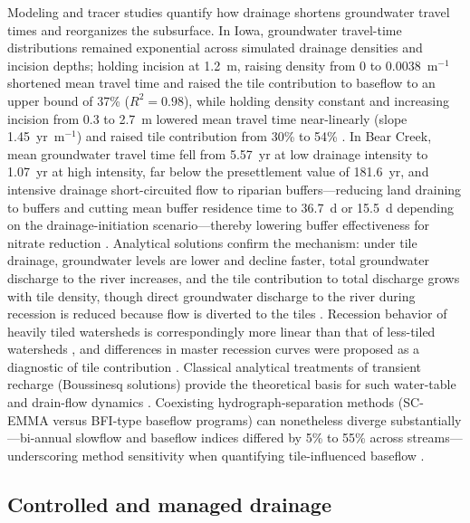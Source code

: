 Modeling and tracer studies quantify how drainage shortens groundwater travel times and reorganizes the subsurface. In Iowa, groundwater travel-time distributions remained exponential across simulated drainage densities and incision depths; holding incision at 1.2~m, raising density from 0 to 0.0038~m$^{-1}$ shortened mean travel time and raised the tile contribution to baseflow to an upper bound of 37\% ($R^2=0.98$), while holding density constant and increasing incision from 0.3 to 2.7~m lowered mean travel time near-linearly (slope 1.45~yr~m$^{-1}$) and raised tile contribution from 30\% to 54\% \parencite{Schilling2012}. In Bear Creek, mean groundwater travel time fell from 5.57~yr at low drainage intensity to 1.07~yr at high intensity, far below the presettlement value of 181.6~yr, and intensive drainage short-circuited flow to riparian buffers---reducing land draining to buffers and cutting mean buffer residence time to 36.7~d or 15.5~d depending on the drainage-initiation scenario---thereby lowering buffer effectiveness for nitrate reduction \parencite{Schilling2015}. Analytical solutions confirm the mechanism: under tile drainage, groundwater levels are lower and decline faster, total groundwater discharge to the river increases, and the tile contribution to total discharge grows with tile density, though direct groundwater discharge to the river during recession is reduced because flow is diverted to the tiles \parencite{Liang2015}. Recession behavior of heavily tiled watersheds is correspondingly more linear than that of less-tiled watersheds \parencite{Schilling2008}, and differences in master recession curves were proposed as a diagnostic of tile contribution \parencite{Schilling2008}. Classical analytical treatments of transient recharge (Boussinesq solutions) provide the theoretical basis for such water-table and drain-flow dynamics \parencite{SINGH1980,Bouarfa2000}. Coexisting hydrograph-separation methods (SC-EMMA versus BFI-type baseflow programs) can nonetheless diverge substantially---bi-annual slowflow and baseflow indices differed by 5\% to 55\% across streams---underscoring method sensitivity when quantifying tile-influenced baseflow \parencite{Kronholm2015}.

\subsection{Controlled and managed drainage}

